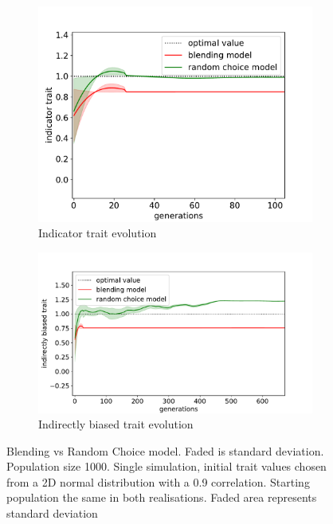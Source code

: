 \documentclass[11pt]{article}
\begin{document}
  \begin{figure}
  \begin{subfigure}[b]{\linewidth}
  \caption{Indicator trait evolution}
    \includegraphics[width=\linewidth]{../../graphs/blending-vs-random/indicator_single_1000x1000_09Corr.pdf}
  \end{subfigure}
  \begin{subfigure}[b]{\linewidth}
  \caption{Indirectly biased trait evolution}
    \includegraphics[width=\linewidth]{../../graphs/blending-vs-random/indirect_single_1000x1000_09Corr.pdf}
  \end{subfigure}
  \caption{Blending vs Random Choice model. Faded is standard deviation. Population size 1000. Single simulation, initial trait values chosen from a 2D normal distribution with a 0.9 correlation. Starting population the same in both realisations. Faded area represents standard deviation}
  \label{randomVSblendingFigSingle}
\end{figure}
\end{document}

